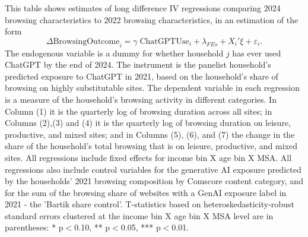 \documentclass[12pt]{article}
\begin{document}
\begin{table}[htbp]
\caption{\\ \centering \textbf{Effect of ChatGPT adoption on browsing activity by category}}  

\setlength{\abovedisplayskip}{0pt}
\setlength{\belowdisplayskip}{0.5pt}
\setlength{\abovedisplayshortskip}{0pt}
\setlength{\belowdisplayshortskip}{0.5pt}
\vspace{-0.1cm} \label{table:2sls-bycat} \footnotesize  This table shows estimates of long difference IV regressions comparing 2024 browsing characteristics to 2022 browsing characteristics, in an estimation of the form
$$\Delta\text{BrowsingOutcome}_{i} = \gamma\; \text{ChatGPTUse}_{i}  + \lambda_{FEs} + X_i'\xi + \varepsilon_{i}.$$
The endogenous variable is a dummy for whether household $j$ has ever used ChatGPT by the end of 2024. The instrument is the panelist household's predicted exposure to ChatGPT in 2021, based on the household's share of browsing on highly substitutable sites. The dependent variable in each regression is a measure of the household's browsing activity in different categories. In Column (1) it is the quarterly log of browsing duration across all sites; in Columns (2),(3) and (4) it is the quarterly log of browsing duration on  leisure, productive, and mixed sites; and in Columns (5), (6), and (7) the change in the share of the household's total browsing that is  on  leisure, productive, and mixed sites. All regressions include fixed effects for income bin X age bin X MSA. All regressions also include control variables for the generative AI exposure predicted by the households' 2021 browsing composition by Comscore content category, and for the sum of the browsing share of websites with a GenAI exposure label in 2021 - the 'Bartik share control'. T-statistics based on heteroskedasticity-robust standard errors clustered at the income bin X age bin X MSA level are in parentheses: * p$<$0.10, ** p$<$0.05, *** p$<$0.01.  \vspace{0.1cm}


\end{table}
\end{document}
